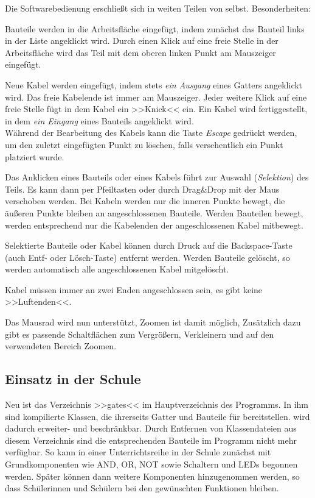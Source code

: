 \documentclass[12pt]{scrartcl}
\begin{document}
Die Softwarebedienung erschließt sich in weiten Teilen von selbst. Besonderheiten:
\begin{compactitem}
\item Bauteile werden in die Arbeitsfläche eingefügt, indem zunächst das Bauteil links in der Liste angeklickt wird. Durch einen Klick auf eine freie Stelle in der Arbeitsfläche wird das Teil mit dem oberen linken Punkt am Mauszeiger eingefügt.
\item Neue Kabel werden eingefügt, indem stets \textit{ein Ausgang} eines Gatters angeklickt wird. Das freie Kabelende ist immer am Mauszeiger. Jeder weitere Klick auf eine freie Stelle fügt in dem Kabel ein >>Knick<< ein. Ein Kabel wird fertiggestellt, in dem \textit{ein Eingang} eines Bauteils angeklickt wird.\\
Während der Bearbeitung des Kabels kann die Taste \textit{Escape} gedrückt werden, um den zuletzt eingefügten Punkt zu löschen, falls versehentlich ein Punkt platziert wurde.
\item Das Anklicken eines Bauteils oder eines Kabels führt zur Auswahl (\textit{Selektion}) des Teils. Es kann dann per Pfeiltasten oder durch Drag\&Drop mit der Maus verschoben werden. Bei Kabeln werden nur die inneren Punkte bewegt, die äußeren Punkte bleiben an angeschlossenen Bauteile. Werden Bauteilen bewegt, werden entsprechend nur die Kabelenden der angeschlossenen Kabel mitbewegt.
\item Selektierte Bauteile oder Kabel können durch Druck auf die Backspace-Taste (auch Entf- oder Lösch-Taste) entfernt werden. Werden Bauteile gelöscht, so werden automatisch alle angeschlossenen Kabel mitgelöscht.
\item Kabel müssen immer an zwei Enden angeschlossen sein, es gibt keine >>Luftenden<<.
\item Das Mausrad wird nun unterstützt, Zoomen ist damit möglich, Zusätzlich dazu gibt es passende Schaltflächen zum Vergrößern, Verkleinern und auf den verwendeten Bereich Zoomen.
\end{compactitem}

\subsection{Einsatz in der Schule}
Neu ist das Verzeichnis >>gates<< im Hauptverzeichnis des Programms. In ihm sind kompilierte Klassen, die ihrerseits Gatter und Bauteile für \lsN{} bereitstellen. \lsN{} wird dadurch erweiter- und beschränkbar. Durch Entfernen von Klassendateien aus diesem Verzeichnis sind die entsprechenden Bauteile im Programm nicht mehr verfügbar. So kann in einer Unterrichtsreihe in der Schule zunächst mit Grundkomponenten wie AND, OR, NOT sowie Schaltern und LEDs begonnen werden. Später können dann weitere Komponenten hinzugenommen werden, so dass Schülerinnen und Schülern bei den gewünschten Funktionen bleiben.
\end{document}
